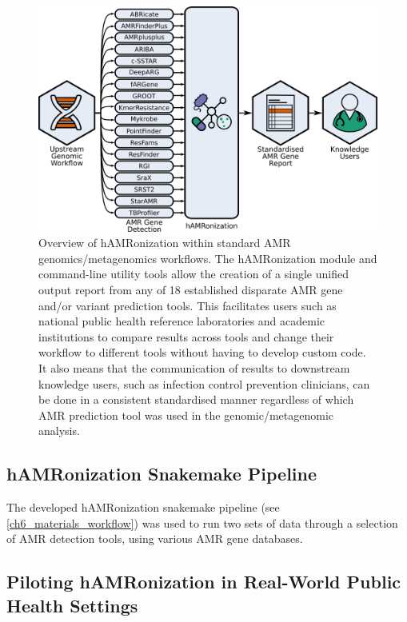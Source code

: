\begin{figure}[]
\centering
\includegraphics[width=\textwidth]{figures/chapter 6/Fig 1.png}
\caption{ Overview of hAMRonization within standard AMR genomics/metagenomics workflows. The hAMRonization module and command-line utility tools allow the creation of a single unified output report from any of 18 established disparate AMR gene and/or variant prediction tools. This facilitates users such as national public health reference laboratories and academic institutions to compare results across tools and change their workflow to different tools without having to develop custom code.  It also means that the communication of results to downstream knowledge users, such as infection control prevention clinicians, can be done in a consistent standardised manner regardless of which AMR prediction tool was used in the genomic/metagenomic analysis.}
\label{fig:chap6_figure1}
\end{figure}

\subsection{hAMRonization Snakemake Pipeline}

The developed  hAMRonization snakemake pipeline (see \ref{ch6_materials_workflow}) was used to run two sets of data through a selection of AMR detection tools, using various AMR gene databases. 

\subsection{Piloting hAMRonization in Real-World Public Health Settings}

